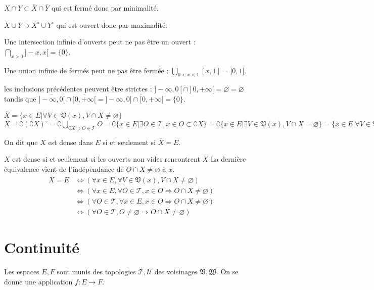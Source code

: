\documentclass[a4paper, 11pt, french]{book}
\newenvironment{itemise}{\itemize}{\enditemize}
\theoremstyle{plain} %
\theoremstyle{definition} %
\theoremstyle{remark} %
\newcommand{\1}{\mathds{1}}
\newcommand\vide{\varnothing}
\begin{document}
$X\cap Y\subset\overline{X}\cap\overline{Y}$ qui est fermé donc par minimalité.

$X\cup Y\supset X^\circ\cup Y^\circ$ qui est ouvert donc par maximalité.

\remarque
\begin{itemise}
	\item Une intersection infinie d'ouverts peut ne pas être un ouvert : $\bigcap_{x>0}]-x,x[=\{0\}$.
	\item Une union infinie de fermés peut ne pas être fermée : $\bigcup_{0<x<1}[x,1]=]0, 1]$.
	\item les inclusions précédentes peuvent être strictes : $\overline{]-\infty, 0[\cap]0, +\infty[}=\overline{\vide}=\vide$ tandis que  $\overline{]-\infty, 0[}\cap\overline{]0, +\infty[}=]-\infty, 0]\cap\overline[0, +\infty[=\{0\}$.
\end{itemise}

\proposition
$\overline{X}=\{x\in E| \forall V\in\mathfrak{V}(x), V\cap X\neq\vide\}$
\demonstration
$\overline{X}
=\complement(\complement X)^\circ
=\complement\bigcup_{\complement X\supset O\in\mathscr{T}}O
=\complement\{x\in E| \exists O\in\mathscr{T}, x\in O\subset\complement X\}
=\complement\{x\in E| \exists V\in\mathfrak{V}(x), V\cap X=\vide\}
=\{x\in E| \forall V\in\mathfrak{V}(x), V\cap X\neq\vide\}$

On dit que $X$ est dense dans $E$ si et seulement si $\overline{X}=E$.

\proposition
$X$ est dense si et seulement si les ouverts non vides rencontrent $X$
\demonstration
La dernière équivalence vient de l'indépendance de $O\cap X\neq\vide$ à $x$.
$$
\begin{aligned}
\overline{X}=E
&\Leftrightarrow(\forall x\in E, \forall V\in\mathfrak{V}(x), V\cap X\neq\vide)\\
&\Leftrightarrow(\forall x\in E, \forall O\in\mathscr{T}, x\in O\Rightarrow O\cap X\neq\vide)\\
&\Leftrightarrow(\forall O\in\mathscr{T}, \forall x\in E, x\in O\Rightarrow O\cap X\neq\vide)\\
&\Leftrightarrow(\forall O\in\mathscr{T}, O\neq\vide\Rightarrow O\cap X\neq\vide)
\end{aligned}
$$


\section{Continuité}
Les espaces $E, F$ sont munis des topologies $\mathscr{T}, \mathscr{U}$ des voisinages $\mathfrak{V}, \mathfrak{W}$.
On se donne une application $f\colon E\rightarrow F$.
\end{document}
